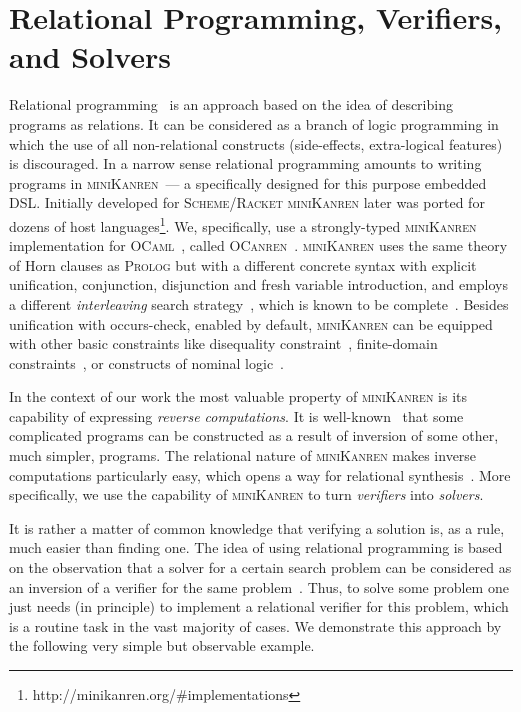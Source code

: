 \section{Relational Programming, Verifiers, and Solvers}
\label{sec:rel}


Relational programming~\cite{TRS} is an approach based on the idea of describing programs as
relations. It can be considered as a branch of logic programming in which the use of
all non-relational constructs (side-effects, extra-logical features) is discouraged. In a
narrow sense relational programming amounts to writing programs in \textsc{miniKanren}~--- a
specifically designed for this purpose embedded DSL. Initially developed for \textsc{Scheme}/\textsc{Racket}
\textsc{miniKanren} later was ported for dozens of host languages\footnote{http://minikanren.org/\#implementations}.
We, specifically, use a strongly-typed \textsc{miniKanren} implementation for \textsc{OCaml}~\cite{ocaml}, called \textsc{OCanren}~\cite{OCanren}.
\textsc{miniKanren} uses the same theory of Horn clauses as \textsc{Prolog} but with a different
concrete syntax with explicit unification, conjunction, disjunction and fresh variable introduction, and
employs a different \emph{interleaving} search strategy~\cite{interleaving}, which is known to be complete~\cite{certified}.
Besides unification with occurs-check, enabled by default, \textsc{miniKanren} can be equipped with other
basic constraints like disequality constraint~\cite{disuni}, finite-domain constraints~\cite{cKanren}, or
constructs of nominal logic~\cite{aKanren}.

In the context of our work the most valuable property of \textsc{miniKanren} is its capability of expressing \emph{reverse computations}.
It is well-known~\cite{SemanticsModifiers,SemanticsModifiers1} that some complicated programs can be constructed as
a result of inversion of some other, much simpler, programs. The relational nature of \textsc{miniKanren} makes
inverse computations particularly easy, which opens a way for relational synthesis~\cite{Untagged,WBirdSeven,PatternMatching}.
More specifically, we use the capability of \textsc{miniKanren} to turn \emph{verifiers} into \emph{solvers}.

It is rather a matter of common knowledge that verifying a solution is, as a rule, much easier than finding one. The idea
of using relational programming is based on the observation that a solver for a certain search problem can be considered as
an inversion of a verifier for the same problem~\cite{searchproblems}. Thus, to solve some problem one just needs (in principle)
to implement a relational verifier for this problem, which is a routine task in the vast majority of cases. We demonstrate
this approach by the following very simple but observable example.

